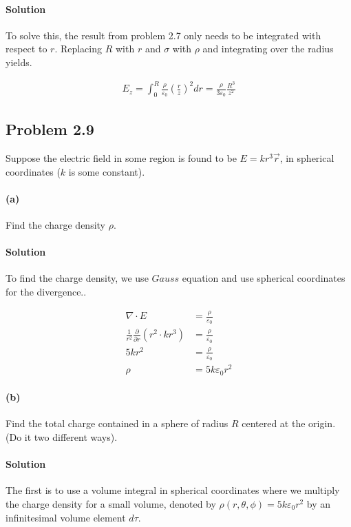 \documentclass{article}
\begin{document}
\paragraph{Solution} To solve this, the result from problem 2.7 only needs to be integrated with respect to $r$. Replacing $R$ with $r$ and $\sigma$ with $\rho$ and integrating over the radius yields. 

\begin{align*}
    E_z = \int_0^R \frac{\rho}{\varepsilon_0}\left(\frac{r}{z}\right)^2 dr = \frac{\rho}{3\varepsilon_0}\frac{R^3}{z^2}
\end{align*}

\newpage

\subsection*{Problem 2.9}
Suppose the electric field in some region is found to be $E = kr^3\vec{r}$, in spherical coordinates ($k$ is some constant).

\paragraph{(a)} Find the charge density $\rho$.
\paragraph{Solution} To find the charge density, we use $Gauss$ equation and use spherical coordinates for the divergence..

\begin{align*}
    \nabla \cdot E &= \frac{\rho}{\varepsilon_0}\\
    \frac{1}{r^2}\frac{\partial }{\partial r}\left(r^2\cdot kr^3 \right) &= \frac{\rho}{\varepsilon_0}\\
    5kr^2 &= \frac{\rho}{\varepsilon_0}\\
    \rho &= 5k\varepsilon_0r^2
\end{align*}

\paragraph{(b)} Find the total charge contained in a sphere of radius $R$ centered at the origin. (Do it two different ways).

\paragraph{Solution} The first is to use a volume integral in spherical coordinates where we multiply the charge density for a small volume, denoted by $\rho(r, \theta, \phi) = 5k\varepsilon_0r^2$ by an infinitesimal volume element $d\tau$.
\end{document}
